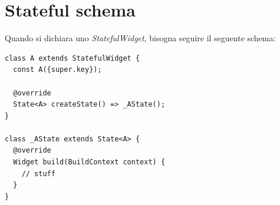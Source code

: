 \documentclass[12pt]{article}
\begin{document}
\section{Stateful schema}
Quando si dichiara uno \textit{StatefulWidget}, bisogna seguire il seguente schema:
\begin{highlight}
\begin{verbatim}
class A extends StatefulWidget {
  const A({super.key});

  @override
  State<A> createState() => _AState();
}

class _AState extends State<A> {
  @override
  Widget build(BuildContext context) {
    // stuff
  }
}
\end{verbatim}
\end{highlight}
\end{document}
